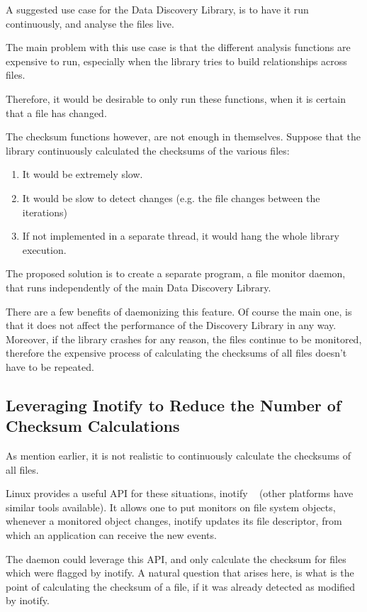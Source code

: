 A suggested use case for the Data Discovery Library, is to have it run continuously, and analyse the files
live.

The main problem with this use case is that the different analysis functions are expensive to run,
especially when the library tries to build relationships across files.

Therefore, it would be desirable to only run these functions, when it is certain that a file has changed.

The checksum functions however, are not enough in themselves.
Suppose that the library continuously calculated the checksums of the various files:
\begin{enumerate}
    \item It would be extremely slow.
    \item It would be slow to detect changes (e.g. the file changes between the iterations)
    \item If not implemented in a separate thread, it would hang the whole library execution.
\end{enumerate}

The proposed solution is to create a separate program, a file monitor daemon, that runs independently
of the main Data Discovery Library.

There are a few benefits of daemonizing this feature.
Of course the main one, is that it does not affect the performance
of the Discovery Library in any way.
Moreover, if the library crashes for any reason, the files continue to be monitored,
therefore the expensive process of calculating the checksums of all files doesn't have to be repeated.

\subsection{Leveraging Inotify to Reduce the Number of Checksum Calculations}
As mention earlier, it is not realistic to continuously calculate the checksums of all files.

Linux provides a useful API for these situations, inotify ~\cite{Inotify} (other platforms have similar tools available).
It allows one to put monitors on file system objects, whenever a monitored object changes, inotify updates its
file descriptor, from which an application can receive the new events.

The daemon could leverage this API, and only calculate the checksum for files which were flagged by inotify.
A natural question that arises here, is what is the point of calculating the checksum of a file,
if it was already detected as modified by inotify.

